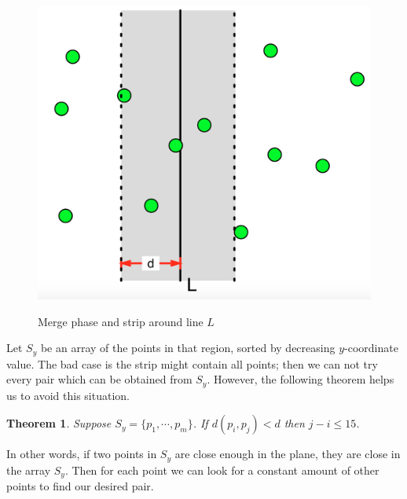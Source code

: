 \documentclass[12pt]{article}
\newtheorem{thm}{Theorem}[section]
\begin{document}
\begin{center}
  \begin{figure}[!htb]
    \centering
    \includegraphics[width=.5\linewidth]{figures/fig20.png}
    \label{fig:21}
    \caption{Merge phase and strip around line $L$}
  \end{figure}
\end{center}

Let $S_y$ be an array of the points in that region, sorted by 
decreasing $y$-coordinate value. The bad case is the strip might contain
all points; then we can not try every pair which can be obtained from $S_y$.
However, the following theorem helps us to avoid this situation.

\begin{thm}
  Suppose $S_y=\{p_1,\cdots,p_m\}$. If $d(p_i,p_j)<d$ then $j-i\leq15$.
\end{thm}

In other words, if two points in $S_y$ are close enough in the plane, 
they are close in the array $S_y$. Then for each point we can look for 
a constant amount of other points to find our desired pair.
\end{document}
